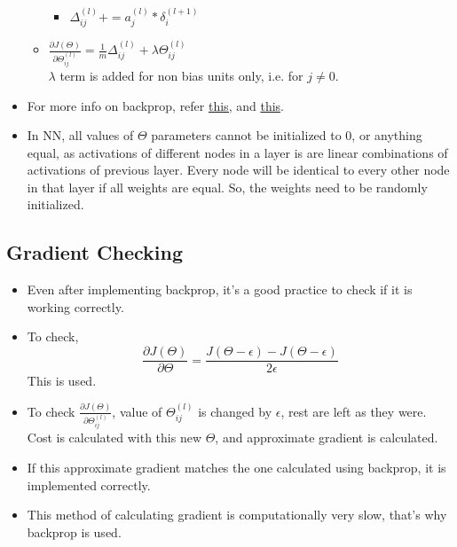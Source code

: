 \documentclass{article}
\begin{document}
\begin{itemize}
\begin{itemize}
\begin{itemize}
			\item $\Delta^{(l)}_{ij}+=a_j^{(l)}*\delta_i^{(l+1)}$
		\end{itemize}
		\item $\frac{\partial J(\Theta)}{\partial \Theta^{(l)}_{ij}} = \frac{1}{m} \Delta^{(l)}_{ij} + \lambda \Theta^{(l)}_{ij}$\\$\lambda$ term is added for non bias units only, i.e. for $j\neq 0$.
	\end{itemize}
	\item For more info on backprop, refer \href{https://youtu.be/Ilg3gGewQ5U}{this,} and \href{https://youtu.be/tIeHLnjs5U8}{this}.
	\item In NN, all values of $\Theta$ parameters cannot be initialized to 0, or anything equal, as activations of different nodes in a layer is are linear combinations of activations of previous layer. Every node will be identical to every other node in that layer if all weights are equal. So, the weights need to be randomly initialized.
\end{itemize}
	\subsection{Gradient Checking}\begin{itemize}
		\item Even after implementing backprop, it's a good practice to check if it is working correctly.
		\item To check, $$\frac{\partial J(\Theta)}{\partial \Theta} = \frac{J(\Theta-\epsilon)-J(\Theta-\epsilon)}{2\epsilon}$$ This is used.
		\item To check $\frac{\partial J(\Theta)}{\partial \Theta^{(l)}_{ij}}$, value of $\Theta^{(l)}_{ij}$ is changed by $\epsilon$, rest are left as they were. Cost is calculated with this new $\Theta$, and approximate gradient is calculated.
		\item If this approximate gradient matches the one calculated using backprop, it is implemented correctly.
		\item This method of calculating gradient is computationally very slow, that's why backprop is used.
	\end{itemize}
\end{document}
